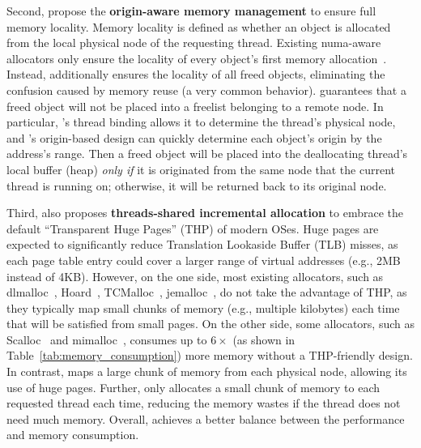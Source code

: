 Second, \NM{} propose the \textbf{origin-aware memory management} to ensure full memory locality. Memory locality is defined as whether an object is allocated from the local physical node of the requesting thread. Existing numa-aware allocators only ensure the locality of every object's first memory allocation~\cite{ tcmallocnew, kim2013node, yang2019jarena, mimalloc}.  Instead, \NM{} additionally ensures the locality of all freed objects, eliminating the confusion caused by memory reuse (a very common behavior). \NM{} guarantees that a freed object will not be placed into a freelist belonging to a remote node. In particular, \NM{}'s thread binding allows it to determine the thread's physical node, and \NM{}'s origin-based design can quickly determine each object's origin by the address's range. Then a freed object will be placed into the deallocating thread's local buffer (heap) \textit{only if} it is originated from the same node that the current thread is running on; otherwise, it will be returned back to its original node. 

Third, \NM{} also proposes \textbf{threads-shared incremental allocation} to embrace the default ``Transparent Huge Pages'' (THP) of modern OSes. Huge pages are expected to significantly reduce Translation Lookaside Buffer (TLB) misses, as each page table entry could cover a larger range of virtual addresses (e.g., 2MB instead of 4KB). However, on the one side, most existing allocators, such as dlmalloc~\cite{dlmalloc},  Hoard~\cite{Hoard}, TCMalloc~\cite{tcmalloc}, jemalloc~\cite{jemalloc}, do not take the advantage of THP, as they typically map small chunks of memory (e.g., multiple kilobytes) each time that will be satisfied from small pages. On the other side, some allocators, such as Scalloc~\cite{Scalloc} and mimalloc~\cite{mimalloc}, consumes up to $6\times$ (as shown in Table~\ref{tab:memory_consumption}) more memory without a THP-friendly design. In contrast, \NM{} maps a large chunk of memory from each physical node, allowing its use of huge pages. Further, \NM{} only allocates a small chunk of memory to each requested thread each time, reducing the memory wastes if the thread does not need  much memory. Overall, \NM{} achieves a better balance between the performance and memory consumption. 

